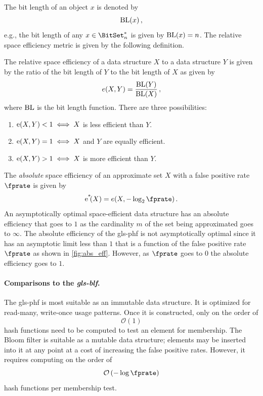 \documentclass[ ../main.tex]{subfiles}
\begin{document}
The bit length of an object $x$ is denoted by
\begin{equation}
    \operatorname{BL}(x)\,,
\end{equation}
e.g., the bit length of any $x \in \BitSet^*_n$ is given by $\operatorname{BL}(x) = n$. The relative space efficiency metric is given by the following definition.
\begin{definition}
The relative space efficiency of a data structure $X$ to a data structure $Y$ is given by the ratio of the bit length of $Y$ to the bit length of $X$ as given by
\begin{equation}
    e(X,Y)=\frac{\operatorname{BL}(Y)}{\operatorname{BL}(X)}\,,
\end{equation}
where $\operatorname{BL}$ is the bit length function. There are three possibilities:
\begin{enumerate}
    \item $\operatorname{e}(X,Y) < 1 \iff X$ is less efficient than $Y$.
    \item $\operatorname{e}(X,Y) = 1 \iff X$ and $Y$ are equally efficient.
    \item $\operatorname{e}(X,Y) > 1 \iff X$ is more efficient than $Y$.
\end{enumerate}
\end{definition}

The \emph{absolute} space efficiency of an approximate set $X$ with a false positive rate $\fprate$ is given by
\begin{equation}
    \AE\!(X) = e(X,-\log_2 \fprate)\,.
\end{equation}
An asymptotically optimal space-efficient data structure has an absolute efficiency that goes to $1$ as the cardinality $m$ of the set being approximated goes to $\infty$. The absolute efficiency of the \gls{gls-phf} is not asymptotically optimal since it has an asymptotic limit less than $1$ that is a function of the false positive rate $\fprate$ as shown in \cref{fig:abs_eff}. However, as $\fprate$ goes to $0$ the absolute efficiency goes to $1$.

\paragraph{Comparisons to the \emph{\gls{gls-blf}}.}
The \gls{gls-phf} is most suitable as an immutable data structure. It is optimized for read-many, write-once usage patterns. Once it is constructed, only on the order of
\begin{equation}
    \mathcal{O} \left( 1 \right)
\end{equation}
hash functions need to be computed to test an element for membership. The Bloom filter is suitable as a mutable data structure; elements may be inserted into it at any point at a cost of increasing the false positive rates. However, it requires computing on the order of
\begin{equation}
    \mathcal{O}\left(-\log \fprate\right)
\end{equation}
hash functions per membership test.
\end{document}
